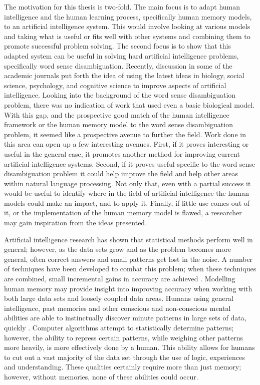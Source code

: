 The motivation for this thesis is two-fold.  The main focus is to adapt human
intelligence and the human learning process, specifically human memory models,
to an artificial intelligence system. This would involve looking at various models
and taking what is useful or fits well with other systems and combining them to 
promote successful problem solving.  The second focus is to show that this
adapted system can be useful in solving hard artificial intelligence problems,
specifically word sense disambiguation.  Recently, discussion in some of the
academic journals put forth the idea of using the latest ideas in biology, 
social science,
psychology, and cognitive science to improve aspects of artificial intelligence.
Looking into the background of the word sense disambiguation problem, there was
no indication of work that used even a basic biological model. With this gap,
and the prospective good match of the human intelligence framework or the human
memory model to the word sense disambiguation problem, it seemed like a prospective
avenue to further the field.  Work done in this area can open up a few interesting
avenues. First, if it proves interesting or useful in the general case, it
promotes another method for improving current artificial intelligence systems.
Second, if it proves useful specific to the word sense disambiguation problem it
could help improve the field and help other areas within natural language
processing.  Not only that, even with a partial success it would be useful to
identify where in the field of artificial intelligence the human models could
make an impact, and to apply it.  Finally, if little use comes out of it, or the
implementation of the human memory model is flawed, a researcher may gain
inspiration from the ideas presented.

Artificial intelligence research has shown that statistical methods perform well
in general; however, as the data sets grow and as the problem becomes more general, 
often correct answers and small patterns get lost in the noise.  A number of techniques have been developed
to combat this problem; when these techniques are combined, small incremental
gains in accuracy are achieved \cite{ENSEMBLE2}.  Modelling human memory may
provide insight into improving accuracy when working with both large data sets
and loosely coupled data areas.  Humans using general intelligence, past
memories and other conscious and non-conscious mental abilities are able to
instinctually discover minute patterns in large sets of data, quickly
\cite{SUBQUESTION}.  Computer algorithms attempt to statistically determine patterns;
however, the ability to repress certain patterns, while weighing other patterns
more heavily, is more effectively done by a human.  This ability allows for
humans to cut out a vast majority of the data set through the use of logic,
experiences and understanding.  These qualities certainly require more than just
memory; however, without memories, none of these abilities could occur.

